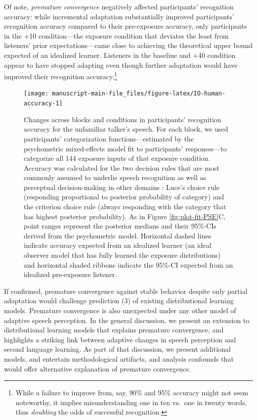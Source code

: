 \documentclass[
  11pt,
  man,mask,floatsintext]{apa6}
\begin{document}
Of note, \emph{premature convergence} negatively affected participants' recognition accuracy: while incremental adaptation substantially improved participants' recognition accuracy compared to their pre-exposure accuracy, only participants in the +10 condition---the exposure condition that deviates the least from listeners' prior expectations---came close to achieving the theoretical upper bound expected of an idealized learner. Listeners in the baseline and +40 condition appear to have stopped adapting even though further adaptation would have improved their recognition accuracy.\footnote{While a failure to improve from, say, 90\% and 95\% accuracy might not seem noteworthy, it implies misunderstanding one in ten vs.~one in twenty words, thus \emph{doubling} the odds of successful recognition.}



\begin{figure}[!ht]

{\centering \texttt{[image: manuscript-main-file\_files/figure-latex/IO-human-accuracy-1]} 

}

\caption{Changes across blocks and conditions in participants' recognition accuracy for the unfamiliar talker's speech. For each block, we used participants' categorization functions---estimated by the psychometric mixed-effects model fit to participants' responses---to categorize all 144 exposure inputs of that exposure condition. Accuracy was calculated for the two decision rules that are most commonly assumed to underlie speech recognition as well as perceptual decision-making in other domains \autocite[for review, see][]{massaro-friedman1990}: Luce's choice rule (responding proportional to posterior probability of category) and the criterion choice rule (always responding with the category that has highest posterior probability). As in Figure \ref{fig:plot-fit-PSE}C, point ranges represent the posterior medians and their 95\%-CIs derived from the psychometric model. Horizontal dashed lines indicate accuracy expected from an idealized learner (an ideal observer model that has fully learned the exposure distributions) and horizontal shaded ribbons indicate the 95\%-CI expected from an idealized pre-exposure listener.}\label{fig:IO-human-accuracy}
\end{figure}

If confirmed, premature convergence against stable behavior despite only partial adaptation would challenge prediction (3) of existing distributional learning models. Premature convergence is also unexpected under any other model of adaptive speech perception. In the general discussion, we present an extension to distributional learning models that explains premature convergence, and highlights a striking link between adaptive changes in speech perception and second language learning. As part of that discussion, we present additional models, and entertain methodological artifacts, and analysis confounds that would offer alternative explanation of premature convergence.
\end{document}

